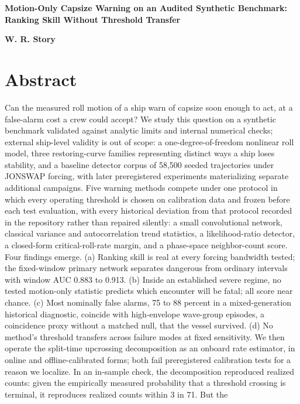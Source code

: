 \documentclass[11pt]{article}
\begin{document}
\begin{center}{\LARGE\bfseries Motion-Only Capsize Warning on an Audited Synthetic Benchmark: Ranking Skill Without Threshold Transfer}\end{center}

\textbf{W. R. Story}

\section*{Abstract}

Can the measured roll motion of a ship warn of capsize soon enough to act, at a false-alarm
cost a crew could accept? We study this question on a synthetic benchmark validated against
analytic limits and internal numerical checks; external ship-level validity is out of scope: a
one-degree-of-freedom nonlinear roll model, three restoring-curve families representing
distinct ways a ship loses stability, and a baseline detector corpus of 58,500 seeded
trajectories under JONSWAP forcing, with later preregistered experiments materializing
separate additional campaigns.
Five warning methods compete under one protocol in which every operating threshold is chosen on
calibration data and frozen before each test evaluation, with every historical deviation from
that protocol recorded in the repository rather than repaired silently: a small convolutional
network, classical variance
and autocorrelation trend statistics, a likelihood-ratio detector, a closed-form
critical-roll-rate margin, and a phase-space neighbor-count score. Four findings emerge.
(a) Ranking skill is real at every forcing bandwidth tested; the fixed-window primary network
separates dangerous from ordinary intervals with window AUC 0.883 to 0.913. (b) Inside an
established severe regime, no tested motion-only statistic predicts which encounter will be fatal;
all score near chance. (c) Most nominally
false alarms, 75 to 88 percent in a mixed-generation historical diagnostic, coincide with
high-envelope wave-group episodes, a coincidence proxy without a matched null, that the vessel
survived. (d) No method's threshold transfers across failure modes at fixed sensitivity. We
then operate the split-time upcrossing decomposition as an onboard rate estimator, in online
and offline-calibrated forms; both fail preregistered calibration tests for a reason we
localize. In an in-sample check, the decomposition reproduced realized counts: given the
empirically measured probability that a
threshold crossing is terminal, it reproduces realized counts within 3 in 71. But the
\end{document}
